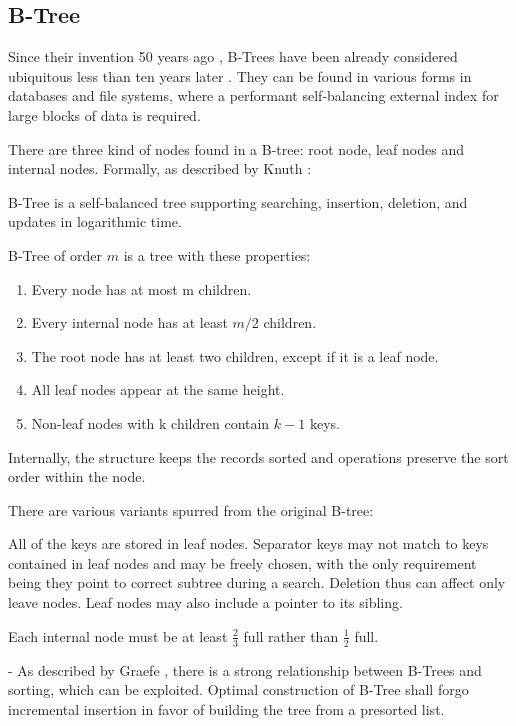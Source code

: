 \subsection{B-Tree}

Since their invention 50 years ago \cite{bayer-org}, B-Trees have been already considered ubiquitous less than ten years later \cite{10.1145/356770.356776}. They can be found in various forms in databases and file systems, where a performant self-balancing external index for large blocks of data is required.



There are three kind of nodes found in a B-tree: root node, leaf nodes and internal nodes. Formally, as described by Knuth \cite{knuth1998art}:

\begin{definition}[B-Tree]\label{def:btree}
  B-Tree is a self-balanced tree supporting searching, insertion, deletion, and updates in logarithmic time.

  B-Tree of order $m$ is a tree with these properties:
  \begin{enumerate}
    \item Every node has at most m children.
    \item Every internal node has at least $m/2$ children.
    \item The root node has at least two children, except if it is a leaf node.
    \item All leaf nodes appear at the same height.
    \item Non-leaf nodes with k children contain $k - 1$ keys.
  \end{enumerate}
\end{definition}

Internally, the structure keeps the records sorted and operations preserve the sort order within the node.

There are various variants spurred from the original B-tree:

\begin{definition}[B$^+$Tree]\label{def:bplustree}
  All of the keys are stored in leaf nodes. Separator keys may not match to keys contained in leaf nodes and may be freely chosen, with the only requirement being they point to correct subtree during a search. Deletion thus can affect only leave nodes. Leaf nodes may also include a pointer to its sibling.
\end{definition}

\begin{definition}\label{def:bstartree}
  Each internal node must be at least $\frac{2}{3}$ full rather than $\frac{1}{2}$ full.
\end{definition}

- As described by Graefe \cite{goetz-tech}, there is a strong relationship between B-Trees and sorting, which can be exploited. Optimal construction of B-Tree shall forgo incremental insertion in favor of building the tree from a presorted list.
